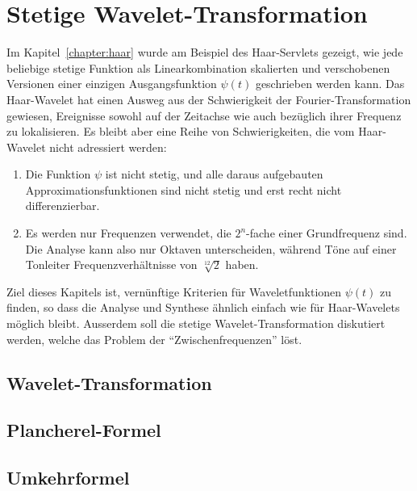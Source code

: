 %
%
%
\chapter{Stetige Wavelet-Transformation
\label{chapter:cwt}}
Im Kapitel~\ref{chapter:haar} wurde am Beispiel des Haar-Servlets
gezeigt, wie jede beliebige stetige Funktion als Linearkombination 
skalierten und verschobenen Versionen einer einzigen Ausgangsfunktion
$\psi(t)$ geschrieben werden kann.
Das Haar-Wavelet hat einen Ausweg aus der Schwierigkeit der
Fourier-Transformation gewiesen, Ereignisse sowohl auf der Zeitachse
wie auch bezüglich ihrer Frequenz zu lokalisieren.
Es bleibt aber eine Reihe von Schwierigkeiten, die vom Haar-Wavelet nicht
adressiert werden:
\begin{enumerate}
\item
Die Funktion $\psi$ ist nicht stetig, und alle daraus aufgebauten
Approximationsfunktionen sind nicht stetig
und erst recht nicht differenzierbar.
\item
Es werden nur Frequenzen verwendet, die $2^n$-fache einer Grundfrequenz
sind.
Die Analyse kann also nur Oktaven unterscheiden, während
Töne auf einer Tonleiter Frequenzverhältnisse von $\sqrt[12]{2}$ haben.
\end{enumerate}
Ziel dieses Kapitels ist, vernünftige Kriterien für Waveletfunktionen
$\psi(t)$ zu finden, so dass die Analyse und Synthese ähnlich einfach
wie für Haar-Wavelets möglich bleibt.
Ausserdem soll die stetige Wavelet-Transformation diskutiert werden,
welche das Problem der ``Zwischenfrequenzen'' löst.



\section{Wavelet-Transformation}

\section{Plancherel-Formel}

\section{Umkehrformel}







